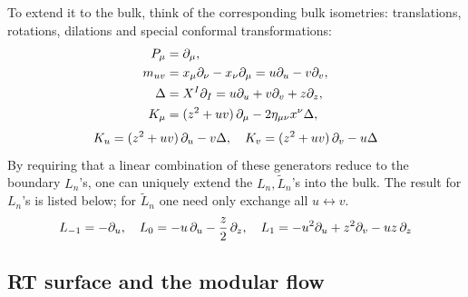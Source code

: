 \documentclass[11pt,a4paper,utf8]{article}
\renewcommand{\tilde}[1]{\ensuremath{\widetilde{#1}}}
\begin{document}
	To extend it to the bulk, think of the corresponding bulk isometries: translations, rotations, dilations and special conformal transformations:
	\begin{equation}
	\begin{aligned}
		P_\mu
		&= \partial_{\mu},\\
		m_{uv}
		&= x_\mu \partial_{\nu} - x_\nu \partial_{\mu}
		= u\partial_{u} - v\partial_{v},\\
		\Delta
		&= X^I \partial_{I}
		= u\partial_{u} + v\partial_{v} + z\partial_{z},\\
		K_\mu
		&= (z^2 + uv)\,\partial_{\mu}
			- 2\eta_{\mu\nu} x^\nu \Delta,
	\end{aligned}
	\end{equation}
	\begin{equation}
		K_u = (z^2 + uv)\,\partial_{u} - v \Delta,
	\quad
		K_v = (z^2 + uv)\,\partial_{v} - u \Delta
	\end{equation}
	By requiring that a linear combination of these generators reduce to the boundary $L_n$'s, one can uniquely extend the $L_n,\tilde{L}_n$'s into the bulk. The result for $L_n$'s is listed below; for $\tilde{L}_n$ one need only exchange all $u\leftrightarrow v$.
	\begin{equation}
		L_{-1} = -\partial_{u},
	\quad
		L_0 = -u\,\partial_{u} - \frac{z}{2}\,\partial_{z},
	\quad
		L_1 = -u^2\partial_{u} + z^2 \partial_{v}
			- uz\,\partial_{z}
	\end{equation}

\subsection{RT surface and the modular flow}

\end{document}
